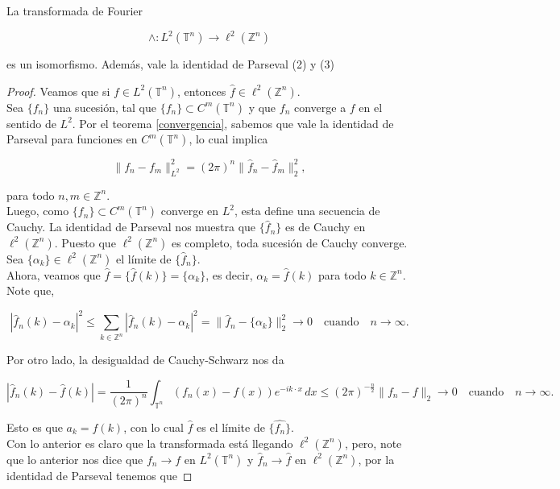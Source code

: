 \documentclass[12pt]{article}
\newcommand\Z{\ensuremath{\mathbb{Z}}}
\newcommand\T{\mathbb{T}}
\renewcommand{\hat}{\widehat}
\begin{document}
\begin{theorem}

La transformada de Fourier

$$
\wedge: L^2\left(\mathbb{T}^n\right) \rightarrow \ell^2\left(\mathbb{Z}^n\right)
$$

es un isomorfismo. Además, vale la identidad de Parseval (2) y (3)
\end{theorem}
\begin{proof}
Veamos que si $f \in L^2(\T^n)$, entonces $\widehat{f} \in \ell^2(\mathbb{Z}^{n})$.\\ 
Sea $\{f_n\}$ una sucesión, tal que $\{f_n\}\subset C^{m}(\T^{n}) $ y que $f_n$ converge a $f$ en el sentido de $L^2$. Por el teorema \ref{convergencia}, sabemos que vale la identidad de Parseval para funciones en $C^{m}(\T^{n}) $, lo cual implica

$$
\|f_n - f_m\|^2_{L^2} = (2\pi)^{n} \|\hat{f}_n - \hat{f}_m\|^2_{2},
$$

para todo $n, m \in \mathbb{Z}^{n}$. \\
Luego, como $\{f_n\} \subset C^{m}(\T^{n})$ converge en $L^2$, esta define una secuencia de Cauchy. La identidad de Parseval  nos muestra que $\{\widehat{f}_n\}$ es de Cauchy en $\ell^2(\mathbb{Z}^{n})$. Puesto que $\ell^2(\mathbb{Z}^{n})$ es completo, toda sucesión de Cauchy converge. Sea $\{\alpha_k\} \in \ell^2(\mathbb{Z}^{n})$ el límite de $\{\widehat{f}_n\}$.\\

Ahora, veamos que  $\widehat{f} = \{\widehat{f}(k)\} = \{\alpha_k\}$, es decir, $\alpha_k = \widehat{f}(k)$ para todo $k\in \Z^n$.\\

Note que,

$$
|\widehat{f}_n(k) - \alpha_k|^2 \leq \sum_{k\in\Z^n} |\widehat{f}_n(k) - \alpha_k|^2 = \|\hat{f}_n - \{\alpha_k\}\|^2_{2} \to 0 \quad \text{cuando} \quad n \to \infty.
$$

Por otro lado, la desigualdad de Cauchy-Schwarz nos da

$$
|\widehat{f}_n(k) - \widehat{f}(k)| = \dfrac{1}{(2\pi)^{n}} \int_{\T^n} (f_n(x) - f(x)) e^{-ik\cdot x} \, dx \leq (2\pi)^{-\frac{n}{2}} \|f_n - f\|_2 \to 0 \quad\text{cuando}\quad n\to \infty.
$$

Esto es que  $a_k=\widehat{f}(k)$, con lo cual $\widehat{f}$ es el límite de $\{ \widehat{f_n} \}$.\\

Con lo anterior es claro que la transformada está llegando $\ell^2(\Z^n)$, pero, note que lo anterior nos dice que $f_n\to f$ en $L^2(\T^n)$ y $\widehat{f}_n\to \hat{f}$ en $\ell^2(\Z^n)$, por la identidad de Parseval tenemos que


\end{proof}
\end{document}
